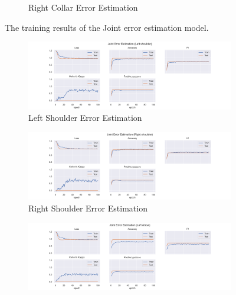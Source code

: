 \begin{figure}
\begin{subfigure}[b]{0.47\linewidth}
      \caption{Right Collar Error Estimation}
      \label{fig:rico_jt_ee}
  \end{subfigure}
  \caption[]{The training results of the Joint error estimation model.}
  \label{fig:Joint_training_results}
\end{figure}


\begin{figure}
  \centering
  \begin{subfigure}[b]{0.47\linewidth}
      \centering
      \includegraphics[width=\textwidth]{figures/Results/jt/JointErrorEstimation_Left shoulder.png}
      \caption{Left Shoulder Error Estimation}
      \label{fig:lesh_jt_ee}
  \end{subfigure}
  \hfill
  \begin{subfigure}[b]{0.47\linewidth}
      \centering
      \includegraphics[width=\textwidth]{figures/Results/jt/JointErrorEstimation_Right shoulder.png}
      \caption{Right Shoulder Error Estimation}
      \label{fig:rish_jt_ee}
  \end{subfigure}
  \hfill
  \begin{subfigure}[b]{0.47\linewidth}
      \centering
      \includegraphics[width=\textwidth]{figures/Results/jt/JointErrorEstimation_Left elbow.png}

\end{subfigure}
\end{figure}
